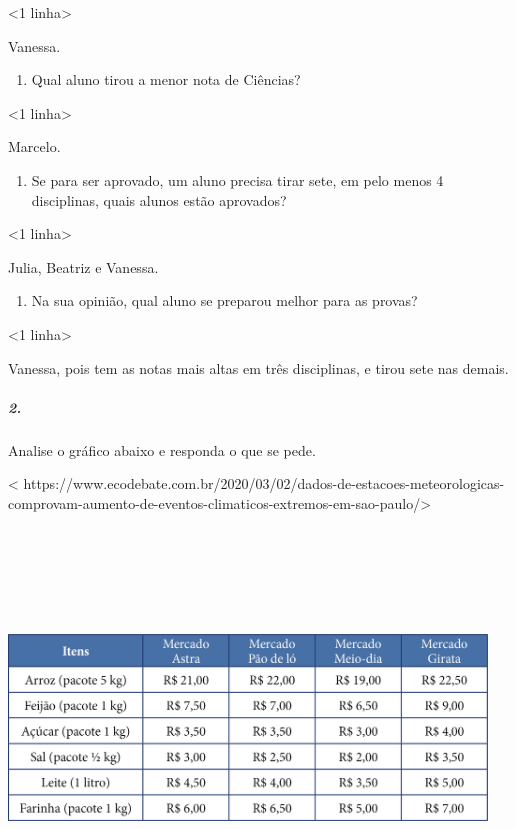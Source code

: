 \textless{}1 linha\textgreater{}

Vanessa.

\begin{enumerate}
\def\labelenumi{\alph{enumi})}
\item
  Qual aluno tirou a menor nota de Ciências?
\end{enumerate}

\textless{}1 linha\textgreater{}

Marcelo.

\begin{enumerate}
\def\labelenumi{\alph{enumi})}
\item
  Se para ser aprovado, um aluno precisa tirar sete, em pelo menos 4
  disciplinas, quais alunos estão aprovados?
\end{enumerate}

\textless{}1 linha\textgreater{}

Julia, Beatriz e Vanessa.

\begin{enumerate}
\def\labelenumi{\alph{enumi})}
\item
  Na sua opinião, qual aluno se preparou melhor para as provas?
\end{enumerate}

\textless{}1 linha\textgreater{}

Vanessa, pois tem as notas mais altas em três disciplinas, e tirou sete
nas demais.

\subparagraph{2.}\label{section-79}

Analise o gráfico abaixo e responda o que se pede.

\textless{}
https://www.ecodebate.com.br/2020/03/02/dados-de-estacoes-meteorologicas-comprovam-aumento-de-eventos-climaticos-extremos-em-sao-paulo/\textgreater{}

\includegraphics[width=5.00000in,height=4.17708in]{media/image92.png}

